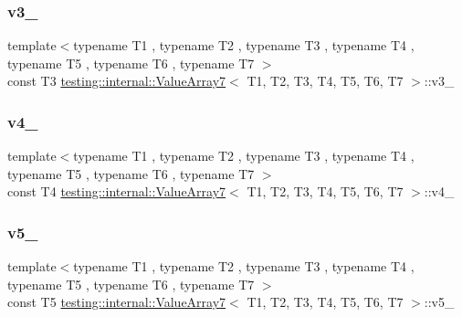 \subsubsection{\texorpdfstring{v3\_}{v3\_}}
{\footnotesize\ttfamily template$<$typename T1 , typename T2 , typename T3 , typename T4 , typename T5 , typename T6 , typename T7 $>$ \\
const T3 \mbox{\hyperlink{classtesting_1_1internal_1_1_value_array7}{testing\+::internal\+::\+Value\+Array7}}$<$ T1, T2, T3, T4, T5, T6, T7 $>$\+::v3\+\_\+\hspace{0.3cm}{\ttfamily [private]}}

\mbox{\label{classtesting_1_1internal_1_1_value_array7_a0f2586c1a4f7e943b8aa90c13416e274}} 
\subsubsection{\texorpdfstring{v4\_}{v4\_}}
{\footnotesize\ttfamily template$<$typename T1 , typename T2 , typename T3 , typename T4 , typename T5 , typename T6 , typename T7 $>$ \\
const T4 \mbox{\hyperlink{classtesting_1_1internal_1_1_value_array7}{testing\+::internal\+::\+Value\+Array7}}$<$ T1, T2, T3, T4, T5, T6, T7 $>$\+::v4\+\_\+\hspace{0.3cm}{\ttfamily [private]}}

\mbox{\label{classtesting_1_1internal_1_1_value_array7_a121fbd6450f99749628a8cce731c6aaf}} 
\subsubsection{\texorpdfstring{v5\_}{v5\_}}
{\footnotesize\ttfamily template$<$typename T1 , typename T2 , typename T3 , typename T4 , typename T5 , typename T6 , typename T7 $>$ \\
const T5 \mbox{\hyperlink{classtesting_1_1internal_1_1_value_array7}{testing\+::internal\+::\+Value\+Array7}}$<$ T1, T2, T3, T4, T5, T6, T7 $>$\+::v5\+\_\+\hspace{0.3cm}{\ttfamily [private]}}

